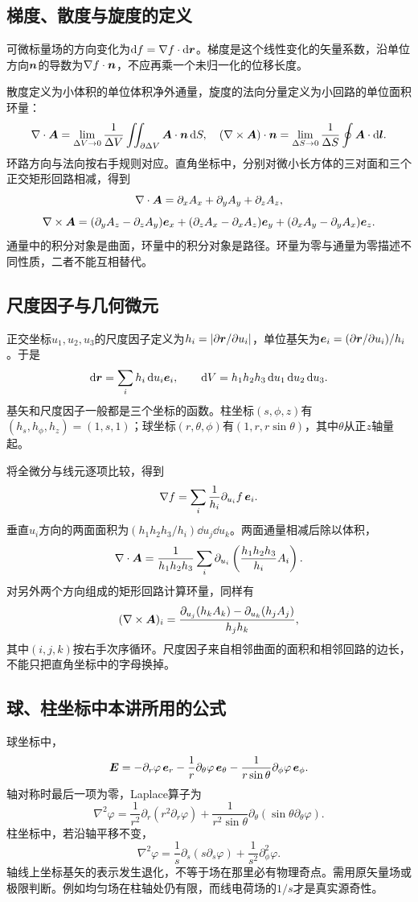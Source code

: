 \subsection{梯度、散度与旋度的定义}
可微标量场的方向变化为$\mathop{}\!\mathrm d f=\nabla f\cdot\mathop{}\!\mathrm d\bm{r}$。梯度是这个线性变化的矢量系数，沿单位方向$\bm{n}$的导数为$\nabla f\cdot\bm{n}$，不应再乘一个未归一化的位移长度。

散度定义为小体积的单位体积净外通量，旋度的法向分量定义为小回路的单位面积环量：
\[\nabla\cdot\bm{A}=\lim_{\Delta V\to0}\frac1{\Delta V}\iint_{\partial\Delta V}\bm{A}\cdot\bm{n}\mathop{}\!\mathrm d S,
\quad(\nabla\times\bm{A})\cdot\bm{n}=\lim_{\Delta S\to0}\frac1{\Delta S}\oint\bm{A}\cdot\mathop{}\!\mathrm d\bm{l}.\]
环路方向与法向按右手规则对应。直角坐标中，分别对微小长方体的三对面和三个正交矩形回路相减，得到
\[\nabla\cdot\bm{A}=\partial_xA_x+\partial_yA_y+\partial_zA_z,\]
\[\nabla\times\bm{A}=(\partial_yA_z-\partial_zA_y)\bm{e}_x
+(\partial_zA_x-\partial_xA_z)\bm{e}_y
+(\partial_xA_y-\partial_yA_x)\bm{e}_z.\]
通量中的积分对象是曲面，环量中的积分对象是路径。环量为零与通量为零描述不同性质，二者不能互相替代。

\subsection{尺度因子与几何微元}
正交坐标$u_1,u_2,u_3$的尺度因子定义为$h_i=|\partial\bm{r}/\partial u_i|$，单位基矢为$\bm{e}_i=(\partial\bm{r}/\partial u_i)/h_i$。于是
\[\mathop{}\!\mathrm d\bm{r}=\sum_i h_i\mathop{}\!\mathrm d u_i\bm{e}_i,\qquad
\mathop{}\!\mathrm d V=h_1h_2h_3\mathop{}\!\mathrm d u_1\mathop{}\!\mathrm d u_2\mathop{}\!\mathrm d u_3.\]
基矢和尺度因子一般都是三个坐标的函数。柱坐标$(s,\phi,z)$有$(h_s,h_\phi,h_z)=(1,s,1)$；球坐标$(r,\theta,\phi)$有$(1,r,r\sin\theta)$，其中$\theta$从正$z$轴量起。

将全微分与线元逐项比较，得到
\[\nabla f=\sum_i\frac1{h_i}\partial_{u_i}f\,\bm{e}_i.\]
垂直$u_i$方向的两面面积为$(h_1h_2h_3/h_i)\dd u_j\dd u_k$。两面通量相减后除以体积，
\[\nabla\cdot\bm{A}=\frac1{h_1h_2h_3}
\sum_i\partial_{u_i}\left(\frac{h_1h_2h_3}{h_i}A_i\right).\]
对另外两个方向组成的矩形回路计算环量，同样有
\[(\nabla\times\bm{A})_i=
\frac{\partial_{u_j}(h_kA_k)-\partial_{u_k}(h_jA_j)}{h_jh_k},\]
其中$(i,j,k)$按右手次序循环。尺度因子来自相邻曲面的面积和相邻回路的边长，不能只把直角坐标中的字母换掉。

\subsection{球、柱坐标中本讲所用的公式}
球坐标中，
\[\bm{E}=-\partial_r\varphi\,\bm{e}_r
-\frac1r\partial_\theta\varphi\,\bm{e}_\theta
-\frac1{r\sin\theta}\partial_\phi\varphi\,\bm{e}_\phi.\]
轴对称时最后一项为零，Laplace算子为
\[\nabla^2\varphi=\frac1{r^2}\partial_r(r^2\partial_r\varphi)
+\frac1{r^2\sin\theta}\partial_\theta(\sin\theta\partial_\theta\varphi).\]
柱坐标中，若沿轴平移不变，
\[\nabla^2\varphi=\frac1s\partial_s(s\partial_s\varphi)
+\frac1{s^2}\partial_\phi^2\varphi.\]
轴线上坐标基矢的表示发生退化，不等于场在那里必有物理奇点。需用原矢量场或极限判断。例如均匀场在柱轴处仍有限，而线电荷场的$1/s$才是真实源奇性。


